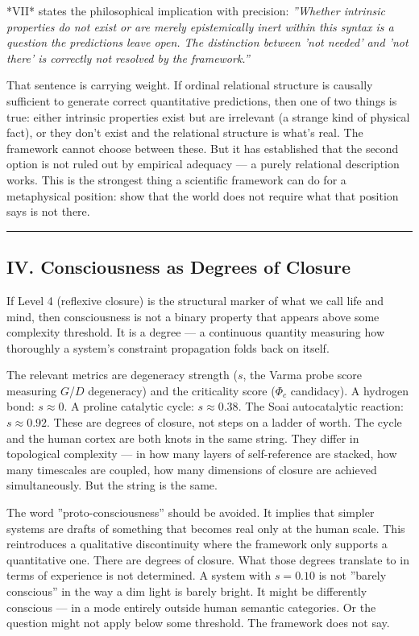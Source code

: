 \documentclass[12pt,a4paper]{article}
\begin{document}
*VII* states the philosophical implication with precision: \emph{''Whether intrinsic properties do not exist or are merely epistemically inert within this syntax is a question the predictions leave open. The distinction between 'not needed' and 'not there' is correctly not resolved by the framework.''}

That sentence is carrying weight. If ordinal relational structure is causally sufficient to generate correct quantitative predictions, then one of two things is true: either intrinsic properties exist but are irrelevant (a strange kind of physical fact), or they don't exist and the relational structure is what's real. The framework cannot choose between these. But it has established that the second option is not ruled out by empirical adequacy --- a purely relational description works. This is the strongest thing a scientific framework can do for a metaphysical position: show that the world does not require what that position says is not there.

\begin{center}
\rule{0.5\textwidth}{0.4pt}
\end{center}

\subsection{IV. Consciousness as Degrees of Closure}

If Level 4 (reflexive closure) is the structural marker of what we call life and mind, then consciousness is not a binary property that appears above some complexity threshold. It is a degree --- a continuous quantity measuring how thoroughly a system's constraint propagation folds back on itself.

The relevant metrics are degeneracy strength ($s$, the Varma probe score measuring $G$/$D$ degeneracy) and the criticality score ($\Phi_c$ candidacy). A hydrogen bond: $s \approx 0$. A proline catalytic cycle: $s \approx 0.38$. The Soai autocatalytic reaction: $s \approx 0.92$. These are degrees of closure, not steps on a ladder of worth. The cycle and the human cortex are both knots in the same string. They differ in topological complexity --- in how many layers of self-reference are stacked, how many timescales are coupled, how many dimensions of closure are achieved simultaneously. But the string is the same.

The word ''proto-consciousness'' should be avoided. It implies that simpler systems are drafts of something that becomes real only at the human scale. This reintroduces a qualitative discontinuity where the framework only supports a quantitative one. There are degrees of closure. What those degrees translate to in terms of experience is not determined. A system with $s = 0.10$ is not ''barely conscious'' in the way a dim light is barely bright. It might be differently conscious --- in a mode entirely outside human semantic categories. Or the question might not apply below some threshold. The framework does not say.
\end{document}
